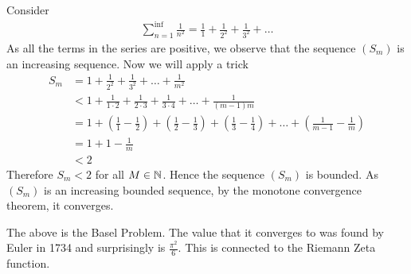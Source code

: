 \begin{eg}
	Consider 
	\begin{align}
		\sum_{n=1}^{\inf} \frac{1}{n^{2}} = \frac{1}{1} + \frac{1}{2^{2}} + \frac{1}{3^{2}} + \ldots
	\end{align}
	As all the terms in the series are positive, we observe that the sequence $\left( S_m \right) $ is an increasing sequence. Now we will apply a trick
	\begin{align}
		S_m &= 1 + \frac{1}{2^{2}} + \frac{1}{3^{2}} + \ldots + \frac{1}{m^{2}}\\
		&< 1 + \frac{1}{1 \cdot 2} + \frac{1}{2 \cdot 3} + \frac{1}{3 \cdot 4} + \ldots + \frac{1}{\left( m-1 \right)m} \\
		&= 1 + \left( \frac{1}{1} - \frac{1}{2} \right) + \left( \frac{1}{2} - \frac{1}{3} \right) + \left( \frac{1}{3} - \frac{1}{4} \right) + \ldots + \left( \frac{1}{m-1} - \frac{1}{m} \right) \\
		&= 1 + 1 - \frac{1}{m} \\
		&< 2
	\end{align}
	Therefore $S_m < 2$ for all $M \in \mathbb{N}$. Hence the sequence $\left( S_m \right) $ is bounded. As $\left( S_m \right) $ is an increasing bounded sequence, by the monotone convergence theorem, it converges.
\end{eg}

\begin{note}
	The above is the Basel Problem. The value that it converges to was found by Euler in 1734 and surprisingly is $\frac{\pi^{2}}{6}$. This is connected to the Riemann Zeta function. 
\end{note}
